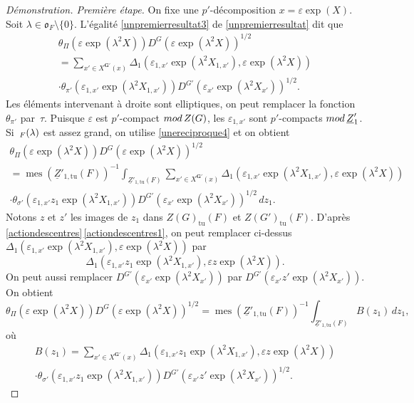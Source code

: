 \documentclass[11pt]{article}
\numberwithin{equation}{section}\providecommand{\og}{«\,}\providecommand{\fg}{\,»}
\newcommand{\NoChangel}[1]{%
\expandafter\let\csname old\string#1\endcsname=#1
\let#1=\relax
\newcommand{#1}{\mathcode`l="716C\csname old\string#1\endcsname\mathcode`l="7160 }%
}
\let\epsilon\varepsilon
\newcommand{\rmod}{\textup{mod}\,}
\newcommand{\fro}{\mathfrak{o}}
\newcommand{\tu}{\mathrm{tu}}
\DeclareMathOperator{\mes}{mes}
\DeclareMathOperator{\val}{val} \NoChangel{\val}
\newcommand{\bG}{\boldsymbol{G}}
\theoremstyle{plain}
\theoremstyle{definition}
\renewcommand{\proofname}{Démonstration}
\begin{document}
\begin{proof}[\proofname. Première étape]
On fixe une $p'$-décomposition $x=\epsilon \exp(X)$. Soit $\lambda\in \fro_{F}\setminus\{0\}$.
L'égalité \eqref{unpremierresultat3} de \ref{unpremierresultat} dit que
\begin{multline*}
\theta_{\Pi}( \epsilon \exp(\lambda^2X))D^G(\epsilon \exp(\lambda^2X))^{1/2}\\
=\sum_{x'\in X^{\bG'}(x)}\Delta_{1}(\epsilon_{1,x'}\exp(\lambda^2X_{1,x'}),\epsilon \exp(\lambda^2X))
\\[-8pt]
\cdot\theta_{\pi'}(\epsilon_{1,x'}\exp(\lambda^2X_{1,x'}))D^{G'}(\epsilon_{x'}\exp(\lambda^2X_{x'}))^{1/2}.
\end{multline*}
Les éléments intervenant à droite sont elliptiques, on peut remplacer la fonction~$\theta_{\pi'}$ par~$\tau$. Puisque $\epsilon$ est $p'$-compact $\rmod Z(G)$, les $\epsilon_{1,x'}$ sont $p'$-compacts $\rmod \underline{Z}'_{1}$. Si~$\val_{F}(\lambda)$ est assez grand, on utilise \eqref{unereciproque4} et on obtient
\begin{multline*}
\theta_{\Pi}( \epsilon \exp(\lambda^2X))D^G(\epsilon \exp(\lambda^2X))^{1/2}\\
=\mes(\underline{Z}'_{1,\tu}(F))^{-1}\int_{\underline{Z}'_{1,\tu}(F)}\sum_{x'\in X^{\bG'}(x)} \Delta_{1}(\epsilon_{1,x'}\exp(\lambda^2X_{1,x'}),\epsilon \exp(\lambda^2X))\\
\cdot\theta_{\sigma'}(\epsilon_{1,x'}z_{1}\exp(\lambda^2X_{1,x'}))D^{G'}(\epsilon_{x'}\exp(\lambda^2X_{x'}))^{1/2}\,dz_{1}.
\end{multline*}
Notons $z$ et $z'$ les images de $z_{1}$ dans $Z(G)_{\tu}(F)$ et $ Z(G')_{\tu}(F)$. D'après \ref{actiondescentres}\,\eqref{actiondescentres1}, on peut remplacer ci-dessus $\Delta_{1}(\epsilon_{1,x'}\exp(\lambda^2X_{1,x'}),\epsilon \exp(\lambda^2X))$ par
\[
\Delta_{1}(\epsilon_{1,x'}z_{1}\exp(\lambda^2X_{1,x'}),\epsilon z \exp(\lambda^2X)).
\]
On peut aussi remplacer $D^{G'}(\epsilon_{x'}\exp(\lambda^2X_{x'}))$ par $D^{G'}(\epsilon_{x'}z'\exp(\lambda^2X_{x'}))$. On obtient%
\begin{equation}\tag{7}\label{unereciproque7}
\theta_{\Pi}( \epsilon \exp(\lambda^2X))D^G(\epsilon \exp(\lambda^2X))^{1/2}=\mes(\underline{Z}'_{1,\tu}(F))^{-1}\int_{\underline{Z}'_{1,\tu}(F)}B(z_{1})\,dz_{1},
\end{equation}
où
\begin{multline*}
B(z_{1})=\sum_{x'\in X^{\bG'}(x)}\Delta_{1}(\epsilon_{1,x'}z_{1}\exp(\lambda^2X_{1,x'}),\epsilon z \exp(\lambda^2X))
\\[-8pt]
\cdot\theta_{\sigma'}(\epsilon_{1,x'}z_{1}\exp(\lambda^2X_{1,x'}))D^{G'}(\epsilon_{x'}z'\exp(\lambda^2X_{x'}))^{1/2}.

\end{multline*}
\end{proof}
\end{document}
